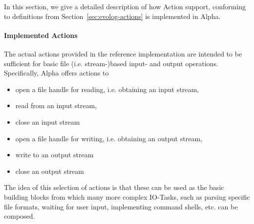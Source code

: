 In this section, we give a detailed description of how Action support, conforming to definitions from Section~\ref{sec:evolog-actions} is implemented in Alpha.

\paragraph{Implemented Actions} 
The actual actions provided in the reference implementation are intended to be sufficient for basic file (i.e. stream-)based input- and output operations. Specifically, Alpha offers actions to
\begin{itemize}
    \item open a file handle for reading, i.e. obtaining an input stream,
    \item read from an input stream,
    \item close an input stream
    \item open a file handle for writing, i.e. obtaining an output stream,
    \item write to an output stream
    \item close an output stream
\end{itemize}
The idea of this selection of actions is that these can be used as the basic building blocks from which many more complex IO-Tasks, such as parsing specific file formats, waiting for user input, implementing command shells, etc. can be composed.

